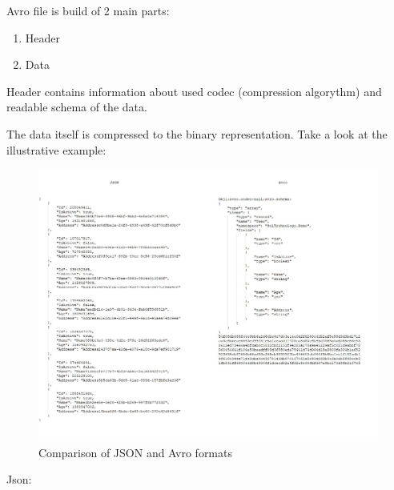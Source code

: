 \documentclass[]{article}
\begin{document}
Avro file is build of 2 main parts:
\begin{enumerate}
	\item Header
	\item Data
\end{enumerate}

Header contains information about used codec (compression algorythm) and readable schema of the data.

The data itself is compressed to the binary representation. Take a look at the illustrative example:


\begin{figure}[H]
	\centering
	\includegraphics[width=\textwidth]{json_avro_comparison}
	\caption{Comparison of JSON and Avro formats}
\end{figure}

Json:
\end{document}
